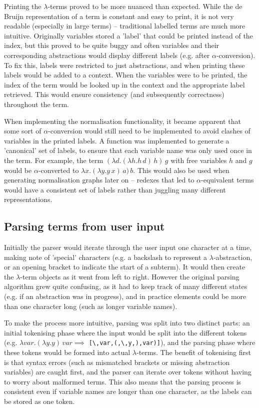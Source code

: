 \documentclass[12pt]{article}
\begin{document}
Printing the $\lambda$-terms proved to be more nuanced than expected. While the de Bruijn representation of a term is constant and easy to print, it is not very readable (especially in large terms) -- traditional labelled terms are much more intuitive. Originally variables stored a 'label' that could be printed instead of the index, but this proved to be quite buggy and often variables and their corresponding abstractions would display different labels (e.g. after $\alpha$-conversion). To fix this, labels were restricted to just abstractions, and when printing these labels would be added to a context. When the variables were to be printed, the index of the term would be looked up in the context and the appropriate label retrieved. This would ensure consistency (and subsequently correctness) throughout the term. 

When implementing the normalisation functionality, it became apparent that some sort of $\alpha$-conversion would still need to be implemented to avoid clashes of variables in the printed labels. A function was implemented to generate a 'canonical' set of labels, to ensure that each variable name was only used once in the term. For example, the term $(\lambda d. (\lambda h. h \, d) \, h) \, g$ with free variables $h$ and $g$ would be $\alpha$-converted to $\lambda x. (\lambda y. y \, x) \, a) \, b$. This would also be used when generating normalisation graphs later on -- redexes that led to $\alpha$-equivalent terms would have a consistent set of labels rather than juggling many different representations.

\subsection{Parsing terms from user input}
Initially the parser would iterate through the user input one character at a time, making note of 'special' characters (e.g. a backslash to represent a $\lambda$-abstraction, or an opening bracket to indicate the start of a subterm). It would then create the $\lambda$-term objects as it went from left to right. However the original parsing algorithm grew quite confusing, as it had to keep track of many different states (e.g. if an abstraction was in progress), and in practice elements could be more than one character long (such as longer variable names).

To make the process more intuitive, parsing was split into two distinct parts: an initial tokenising phase where the input would be split into the different tokens (e.g. $\lambda var. (\lambda y. y) \, var \implies$ \texttt{[\textbackslash,var,(,\textbackslash,y,),var)]}), and the parsing phase where these tokens would be formed into actual $\lambda$-terms. The benefit of tokenising first is that syntax errors (such as mismatched brackets or missing abstraction variables) are caught first, and the parser can iterate over tokens without having to worry about malformed terms. This also means that the parsing process is consistent even if variable names are longer than one character, as the labels can be stored as one token. 
\end{document}
